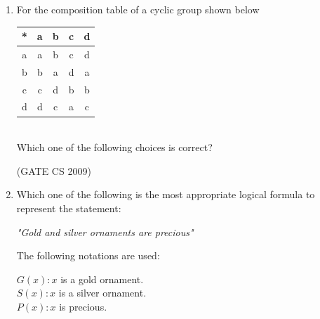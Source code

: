 \documentclass[a4paper, 11pt]{article}
\begin{document}
\begin{enumerate}
    \item  For the composition table of a cyclic group shown below\\
    \begin{tabular}{c|cccc}
        * &a &b &c &d \\
        \hline
        a &a &b &c &d \\
        b &b &a &d &a \\
        c &c &d &b &b \\
        d &d &c &a &c \\
        
    \end{tabular}\\
    Which one of the following choices is correct?\\
    \begin{enumerate}
    \end{enumerate}

    \hfill (GATE CS 2009)

    \item Which one of the following is the most appropriate logical formula to represent the statement:\\
    \begin{center}
        \textit{"Gold and silver ornaments are precious"}\\
    \end{center}
    The following notations are used:\\
        \begin{center}
            $G(x): x$ is a gold ornament.\\
            $S(x): x$ is a silver ornament. \\
            $P(x): x$ is precious.\\
        \end{center}  
    \begin{enumerate}
    \end{enumerate}


\end{enumerate}
\end{document}
